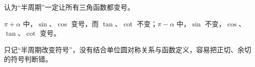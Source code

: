 \begin{trapbox}
\medskip
\begin{description}[style=nextline, leftmargin=2.8em, labelsep=0.5em, itemsep=0.35em]
    \item[\textbf{\textcolor{CTrap}{易错点四（把 $\pi\pm\alpha$ 都理解成简单变号）}}] 认为“半周期”一定让所有三角函数都变号。
    \item[\textbf{\textcolor{CTrap}{正确理解（区分 $\pi+\alpha$ 与 $\pi-\alpha$）：}}] $\pi+\alpha$ 中，$\sin$、$\cos$ 变号，而 $\tan$、$\cot$ 不变；$\pi-\alpha$ 中，$\sin$ 不变，$\cos$、$\tan$、$\cot$ 变号。
    \item[\textbf{\textcolor{CTrap}{错因分析（只背半句）：}}] 只记“半周期改变符号”，没有结合单位圆对称关系与函数定义，容易把正切、余切的符号判断错。
\end{description}
\end{trapbox}

